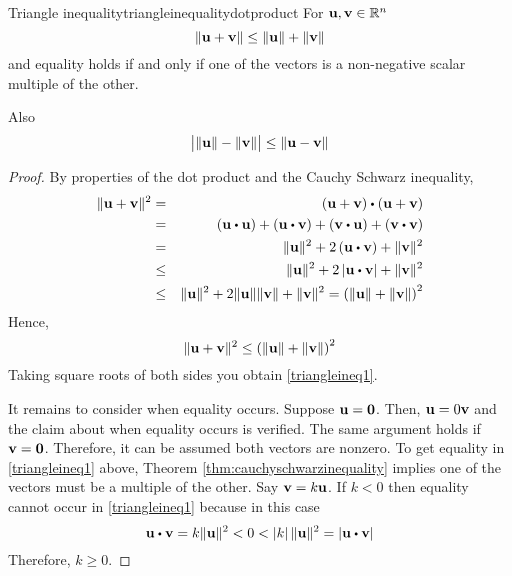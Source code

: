 \begin{theorem}{Triangle inequality}{triangleinequalitydotproduct}
  For ${\bf u},{\bf v}\in \mathbb{R}^{n}$
\begin{equation}
\|{\bf u}+{\bf v}\| \leq \|{\bf u}\| +\|{\bf v}
\|  \label{triangleineq1}
\end{equation}
and equality holds if and only if one of the vectors is a non-negative scalar
multiple of the other. 

Also
\begin{equation}
\big| \|{\bf u}\| -\|{\bf v}\| \big| \leq
\|{\bf u}-{\bf v}\|  \label{triangleineq2}
\end{equation}
\end{theorem}

\begin{proof} By properties of the dot product and the Cauchy Schwarz
inequality,
\begin{eqnarray*}
\norm{\vect{u}+\vect{v}} ^{2} &=& \tup{\vect{u}+\vect{v}} \dotprod \tup{\vect{u}+\vect{v}} \\
& =&\tup{\vect{u}\dotprod \vect{u}} +\tup{\vect{u}\dotprod \vect{v}} +\tup{\vect{v}\dotprod \vect{u}} +\tup{\vect{v}\dotprod \vect{v}} \\
&=&\norm{\vect{u}} ^{2}+2\tup{\vect{u}\dotprod \vect{v}}+\norm{\vect{v}} ^{2} \\
&\leq& \norm{\vect{u}} ^{2}+2\abs{\vect{u}\dotprod \vect{v}}+\norm{\vect{v}} ^{2} \\
&\leq& \norm{\vect{u}} ^{2}+2\norm{\vect{u}} \norm{\vect{v}} +\norm{\vect{v}} ^{2} =\tup{\norm{\vect{u}} +\norm{\vect{v}}} ^{2}
\end{eqnarray*}
Hence,
\begin{equation*}
\|{\bf u}+{\bf v}\| ^{2} \leq \left(\|{\bf u}\| +\|{\bf v}\|
\right) ^{2}
\end{equation*}
Taking square roots of both sides you obtain \ref{triangleineq1}.

It remains to consider when equality occurs. Suppose ${\bf u} = {\bf 0}$.
Then, ${\bf u} = 0 {\bf v}$ and the claim about when
equality occurs is verified. The same argument holds if ${\bf v} = {\bf 0}$. 
 Therefore, it can be assumed both vectors are
nonzero. To get equality in \ref{triangleineq1} above, Theorem \ref{thm:cauchyschwarzinequality} 
implies one of the vectors must be a multiple of
the other. Say ${\bf v}= k {\bf u}$. If $k <0$ then equality
cannot occur in \ref{triangleineq1} because in this case
\begin{equation*}
\vect{u}\dotprod \vect{v} =k \norm{\vect{u}}
^{2}<0<\abs{k} \norm{\vect{u}} ^{2}=\abs{\vect{u}\dotprod \vect{v}}
\end{equation*}
Therefore, $k \geq 0.$


\end{proof}
